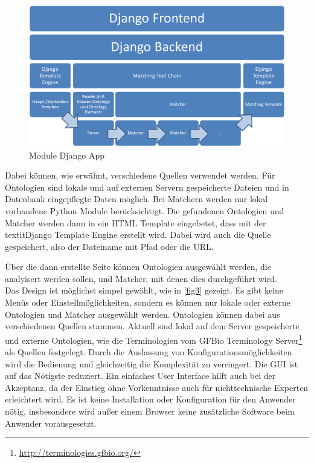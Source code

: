 		\begin{figure}[h!]
		\centering
		\includegraphics[width=1.0\textwidth]{pics/Module-overview1.png}
		\caption{Module Django App}
		\label{fig2}
		\end{figure}
		
		Dabei können, wie erwähnt, verschiedene Quellen verwendet werden. Für
		Ontologien sind lokale und auf externen Servern gespeicherte Dateien und in Datenbank
		eingepflegte Daten möglich. Bei Matchern werden nur lokal vorhandene Python
		Module berücksichtigt. Die gefundenen Ontologien und Matcher werden dann in
		ein HTML Template eingebetet, dass mit der textit{Django Template Engine} erstellt wird. Dabei wird auch die Quelle gespeichert, also der Dateiname mit Pfad oder
		die URL.
		
		\pagebreak[4]
		
		Über die dann erstellte Seite können Ontologien ausgewählt werden, die
		analyisert werden sollen, und Matcher, mit denen dies durchgeführt wird.\\
		Das Design ist möglichst simpel gewählt, wie in \ref{fig3} gezeigt. Es gibt
		keine Menüs oder Einstellmöglichkeiten, sondern es können nur
		lokale oder externe Ontologien und Matcher ausgewählt
		werden. Ontologien können dabei aus verschiedenen Quellen stammen. Aktuell
		sind lokal auf dem Server gespeicherte und externe Ontologien, wie
		die Terminologien vom GFBio Terminology
		Server\footnote{\url{http://terminologies.gfbio.org/}} als Quellen festgelegt.
		Durch die Auslassung von Konfigurationsmöglichkeiten wird die Bedienung und
		gleichzeitig die Komplexität zu verringert. Die GUI ist auf das Nötigste reduziert. Ein einfaches User Interface hilft auch bei der Akzeptanz, da der Einstieg ohne Vorkenntnisse auch für nichttechnische
		Experten erleichtert wird. Es ist keine Installation oder Konfiguration für
		den Anwender nötig, insbesondere wird außer einem Browser keine zusätzliche
		Software beim Anwender vorausgesetzt.
		\pagebreak[4]
